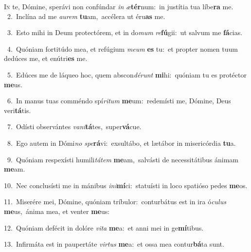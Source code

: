 \lettrine{\initial\textcolor{\initialcolor}{I}}{n} te, Dómine, sperávi non confúndar \textit{in} \textit{æ}\-\textbf{tér}num:~\star in justítia tua líbe\textbf{ra} me.\\
{\numbfont\textcolor{\numbcolor}{~2.}}~Inclína ad me \textit{au}\-\textit{rem} \textbf{tu}\-am,~\star accélera ut éru\textbf{as} me.\par
{\numbfont\textcolor{\numbcolor}{~3.}}~Esto mihi in Deum protectórem, et in do\textit{mum} \textit{re}\-\textbf{fú}gii:~\star ut salvum me \textbf{fá}\-cias.\par
{\numbfont\textcolor{\numbcolor}{~4.}}~Quóniam fortitúdo mea, et refúgium \textit{me}\-\textit{um} \textbf{es} tu:~\star et propter nomen tuum dedúces me, et enútri\textbf{es} me.\par
{\numbfont\textcolor{\numbcolor}{~5.}}~Edúces me de láqueo hoc, quem abscon\-\textit{dé}\-\textit{runt} \textbf{mi}\-hi:~\star quóniam tu es protéctor \textbf{me}\-us.\par
{\numbfont\textcolor{\numbcolor}{~6.}}~In manus tuas comméndo spí\-\textit{ri}\-\textit{tum} \textbf{me}\-um:~\star redemísti me, Dómine, Deus veri\-\textbf{tá}\-tis.\par
{\numbfont\textcolor{\numbcolor}{~7.}}~Odísti observántes \textit{va}\-\textit{ni}\textbf{tá}tes,~\star super\-\textbf{vá}\-cue.\par
{\numbfont\textcolor{\numbcolor}{~8.}}~Ego autem in Dómi\textit{no} \textit{spe}\-\textbf{rá}vi:~\star exsultábo, et lætábor in misericórdia \textbf{tu}\-a.\par
{\numbfont\textcolor{\numbcolor}{~9.}}~Quóniam respexísti humili\-\textit{tá}\-\textit{tem} \textbf{me}\-am,~\star salvásti de necessitátibus ánimam \textbf{me}\-am.\par
{\numbfont\textcolor{\numbcolor}{10.}}~Nec conclusísti me in mánibus \textit{in}\-\textit{i}\textbf{mí}ci:~\star statuísti in loco spatióso pedes \textbf{me}\-os.\par
{\numbfont\textcolor{\numbcolor}{11.}}~Miserére mei, Dómine, quóniam tríbulor:~\dagger conturbátus est in ira ó\-\textit{cu}\-\textit{lus} \textbf{me}\-us,~\star ánima mea, et venter \textbf{me}\-us:\par
{\numbfont\textcolor{\numbcolor}{12.}}~Quóniam defécit in dolóre \textit{vi}\-\textit{ta} \textbf{me}\-a:~\star et anni mei in ge\-\textbf{mí}\-tibus.\par
{\numbfont\textcolor{\numbcolor}{13.}}~Infirmáta est in paupertáte \textit{vir}\-\textit{tus} \textbf{me}\-a:~\star et ossa mea contur\-\textbf{bá}\-ta sunt.\par
